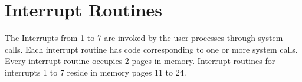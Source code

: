 \documentclass[10pt]{report}
\begin{document}
\section{Interrupt Routines}
\label{sec:interrupt}
The Interrupts from 1 to 7 are invoked by the user processes through system calls. Each interrupt routine has code corresponding to one or more system calls. Every interrupt routine occupies 2 pages in memory. Interrupt routines for interrupts 1 to 7 reside in memory pages 11 to 24.
\end{document}

